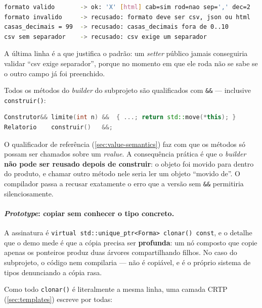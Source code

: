 \begin{lstlisting}[style=bt, language=bash,
    caption={Saída de \texttt{dist/bin/builder}, seção 3: regras que dependem de
             \emph{dois} campos.}]
formato valido       -> ok: 'X' [html] cab=sim rod=nao sep=',' dec=2
formato invalido     -> recusado: formato deve ser csv, json ou html
casas_decimais = 99  -> recusado: casas_decimais fora de 0..10
csv sem separador    -> recusado: csv exige um separador
\end{lstlisting}

A última linha é a que justifica o padrão: um \emph{setter} público jamais
conseguiria validar ``csv exige separador'', porque no momento em que ele roda
não se sabe se o outro campo já foi preenchido.

\begin{armadilha}
Todos os métodos do \emph{builder} do subprojeto são qualificados com
\texttt{\&\&} --- inclusive \texttt{construir()}:
\begin{lstlisting}[style=bt, language=C++, frame=none,
                   xleftmargin=0pt, xrightmargin=0pt]
Construtor&& limite(int n) &&  { ...; return std::move(*this); }
Relatorio    construir()   &&;
\end{lstlisting}
O qualificador de referência (\cref{sec:value-semantics}) faz com que os
métodos só possam ser chamados sobre um \emph{rvalue}. A consequência prática é
que o \emph{builder} \textbf{não pode ser reusado depois de construir}: o objeto
foi movido para dentro do produto, e chamar outro método nele seria ler um
objeto ``movido de''. O compilador passa a recusar exatamente o erro que a
versão sem \texttt{\&\&} permitiria silenciosamente.
\end{armadilha}

\paragraph{\emph{Prototype}: copiar sem conhecer o tipo concreto.} A assinatura
é \texttt{virtual std::unique\_ptr<Forma> clonar() const}, e o detalhe que o
demo mede é que a cópia precisa ser \textbf{profunda}: um nó composto que copie
apenas os ponteiros produz duas árvores compartilhando filhos. No caso do
subprojeto, o código nem compilaria ---  não é
copiável, e é o próprio sistema de tipos denunciando a cópia rasa.

Como todo \texttt{clonar()} é literalmente a mesma linha, uma camada CRTP
(\cref{sec:templates}) escreve por todas:

